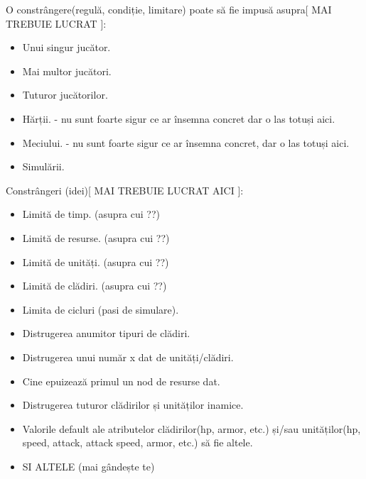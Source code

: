 \documentclass{article}
\begin{document}
O constrângere(regulă, condiție, limitare) poate să fie impusă asupra[ MAI TREBUIE LUCRAT ]:
\begin{itemize}
    \item Unui singur jucător.

    \item Mai multor jucători.

    \item Tuturor jucătorilor.

    \item Hărții. - nu sunt foarte sigur ce ar însemna concret dar o las totuși aici.

    \item Meciului. - nu sunt foarte sigur ce ar însemna concret, dar o las totuși aici.

    \item Simulării.
\end{itemize}

Constrângeri (idei)[ MAI TREBUIE LUCRAT AICI ]:
\begin{itemize}
    \item Limită de timp. (asupra cui ??)

    \item Limită de resurse. (asupra cui ??)

    \item Limită de unități. (asupra cui ??)

    \item Limită de clădiri. (asupra cui ??)

    \item Limita de cicluri (pasi de simulare).

    \item Distrugerea anumitor tipuri de clădiri.

    \item Distrugerea unui număr x dat de unități/clădiri.

    \item Cine epuizează primul un nod de resurse dat.

    \item Distrugerea tuturor clădirilor și unităților inamice.

    \item Valorile default ale atributelor clădirilor(hp, armor, etc.) și/sau unităților(hp, speed, attack, attack speed, armor, etc.) să fie altele.

    \item  SI ALTELE (mai gândește te)
\end{itemize}
\end{document}
